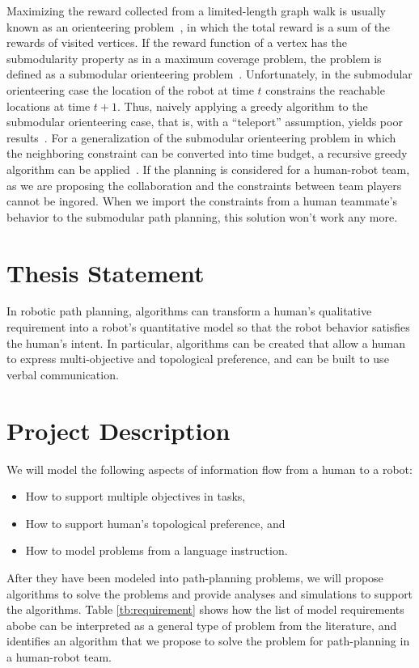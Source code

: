 \documentclass[phd]{byuprop}
\begin{document}
Maximizing the reward collected from a limited-length graph walk is usually known as an orienteering problem~\cite{Vansteenwegen2011}, in which the total reward is a sum of the rewards of visited vertices. 
If the reward function of a vertex has the submodularity property as in a maximum coverage problem, the problem is defined as a submodular orienteering problem~\cite{Chekuri2005}. 
Unfortunately, in the submodular orienteering case the location of the robot at time $ t $ constrains the reachable locations at time $ t+1 $.
Thus, naively applying a greedy algorithm to the submodular orienteering case, that is, with a “teleport” assumption, yields poor results~\cite{Krause2012}. 
For a generalization of the submodular orienteering problem in which the neighboring constraint can be converted into time budget, a recursive greedy algorithm can be applied~\cite{Chekuri2005}.
If the planning is considered for a human-robot team, as we are proposing the collaboration and the constraints between team players cannot be ingored.
When we import the constraints from a human teammate's behavior to the submodular path planning, this solution won't work any more. 


\section{Thesis Statement}
\label{sec:thesis_statement}

In robotic path planning, algorithms can transform a human's qualitative requirement into a robot's quantitative model so that the robot behavior satisfies the human's intent.
In particular, algorithms can be created that allow a human to express multi-objective and topological preference, and can be built to use verbal communication.

\section{Project Description}
\label{sec:project_description}

We will model the following aspects of information flow from a human to a robot: 
\begin{itemize}
	\item How to support multiple objectives in tasks,
	\item How to support human's topological preference, and
	\item How to model problems from a language instruction.
\end{itemize}
After they have been modeled into path-planning problems, we will propose algorithms to solve the problems and provide analyses and simulations to support the algorithms.
Table \ref{tb:requirement} shows how the list of model requirements abobe can be interpreted as a general type of problem from the literature, and identifies an algorithm that we propose to solve the problem for path-planning in a human-robot team.
\end{document}
